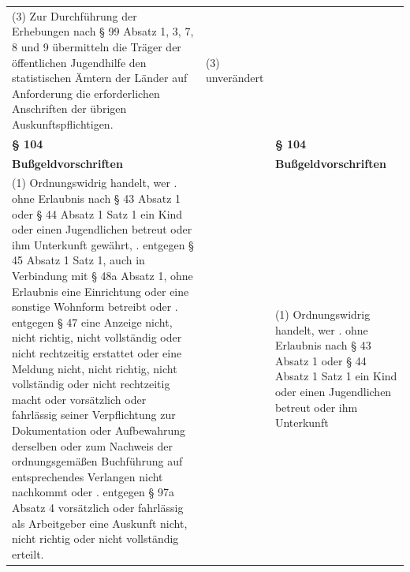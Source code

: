 \documentclass[10pt,a4paper,landscape]{article}
\begin{document}
\begin{longtable}{|L{8.2cm}|L{8.2cm}|L{8.2cm}|}
\hhline{|---|}
(3) Zur Durchführung der Erhebungen nach  \newline \S{} 99 Absatz 1, 3, 7, 8 und 9 übermitteln die  \newline Träger der öffentlichen Jugendhilfe den  \newline statistischen Ämtern der Länder auf  \newline Anforderung die erforderlichen Anschriften  \newline der übrigen Auskunftspflichtigen. & (3) unverändert &  \\
\hhline{|---|}
\textbf{\S{} 104} &  & \textbf{\S{} 104} \\
\hhline{|---|}
\textbf{Bußgeldvorschriften} &  & \textbf{Bußgeldvorschriften} \\
\hhline{|---|}
(1) Ordnungswidrig handelt, wer   .   ohne Erlaubnis nach \S{} 43 Absatz 1 oder  \newline \S{} 44 Absatz 1 Satz 1 ein Kind oder einen  \newline Jugendlichen betreut oder ihm Unterkunft  \newline gewährt,   . entgegen \S{} 45 Absatz 1 Satz 1, auch in  \newline Verbindung mit \S{} 48a Absatz 1, ohne  \newline Erlaubnis eine Einrichtung oder eine  \newline sonstige Wohnform betreibt oder   . entgegen \S{} 47 eine Anzeige nicht, nicht  \newline richtig, nicht vollständig oder nicht  \newline rechtzeitig erstattet oder eine Meldung nicht,  \newline nicht richtig, nicht vollständig oder nicht  \newline rechtzeitig macht oder vorsätzlich oder  \newline fahrlässig seiner Verpflichtung zur  \newline Dokumentation oder Aufbewahrung  derselben oder zum Nachweis der  \newline ordnungsgemäßen Buchführung auf  \newline entsprechendes Verlangen nicht  \newline nachkommt oder   . entgegen \S{} 97a Absatz 4 vorsätzlich oder  \newline fahrlässig als Arbeitgeber eine Auskunft  \newline nicht, nicht richtig oder nicht vollständig  \newline \textcolor{diffred}{erteilt.} &  & (1) Ordnungswidrig handelt, wer   .   ohne Erlaubnis nach \S{} 43 Absatz 1 oder  \newline \S{} 44 Absatz 1 Satz 1 ein Kind oder einen  \newline Jugendlichen betreut oder ihm Unterkunft  \newline 
\end{longtable}
\end{document}
